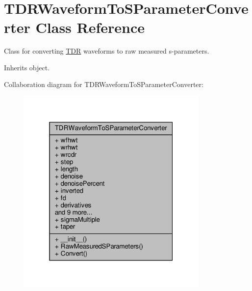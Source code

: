 \hypertarget{classSignalIntegrity_1_1Measurement_1_1TDR_1_1TDRWaveformToSParameterConverter_1_1TDRWaveformToSParameterConverter}{}\section{T\+D\+R\+Waveform\+To\+S\+Parameter\+Converter Class Reference}
\label{classSignalIntegrity_1_1Measurement_1_1TDR_1_1TDRWaveformToSParameterConverter_1_1TDRWaveformToSParameterConverter}


Class for converting \hyperlink{namespaceSignalIntegrity_1_1Measurement_1_1TDR}{T\+DR} waveforms to raw measured s-\/parameters.  




Inherits object.



Collaboration diagram for T\+D\+R\+Waveform\+To\+S\+Parameter\+Converter\+:\nopagebreak
\begin{figure}[H]
\begin{center}
\leavevmode
\includegraphics[width=268pt]{classSignalIntegrity_1_1Measurement_1_1TDR_1_1TDRWaveformToSParameterConverter_1_1TDRWaveformToSParameterConverter__coll__graph}
\end{center}
\end{figure}
